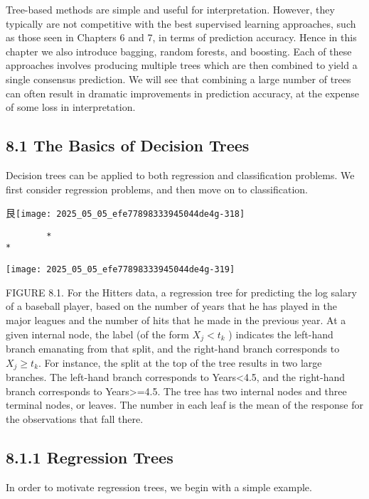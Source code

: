 \documentclass[10pt]{article}
\begin{document}
Tree-based methods are simple and useful for interpretation. However, they typically are not competitive with the best supervised learning approaches, such as those seen in Chapters 6 and 7, in terms of prediction accuracy. Hence in this chapter we also introduce bagging, random forests, and boosting. Each of these approaches involves producing multiple trees which are then combined to yield a single consensus prediction. We will see that combining a large number of trees can often result in dramatic improvements in prediction accuracy, at the expense of some loss in interpretation.

\subsection*{8.1 The Basics of Decision Trees}
Decision trees can be applied to both regression and classification problems. We first consider regression problems, and then move on to classification.\\
$\qquad$

艮\texttt{[image: 2025\_05\_05\_efe77898333945044de4g-318]}

\begin{verbatim}
        *
*
\end{verbatim}

\begin{center}
\texttt{[image: 2025\_05\_05\_efe77898333945044de4g-319]}
\end{center}

FIGURE 8.1. For the Hitters data, a regression tree for predicting the log salary of a baseball player, based on the number of years that he has played in the major leagues and the number of hits that he made in the previous year. At a given internal node, the label (of the form $X_{j}<t_{k}$ ) indicates the left-hand branch emanating from that split, and the right-hand branch corresponds to $X_{j} \geq t_{k}$. For instance, the split at the top of the tree results in two large branches. The left-hand branch corresponds to Years<4.5, and the right-hand branch corresponds to Years>=4.5. The tree has two internal nodes and three terminal nodes, or leaves. The number in each leaf is the mean of the response for the observations that fall there.

\subsection*{8.1.1 Regression Trees}
In order to motivate regression trees, we begin with a simple example.
\end{document}
